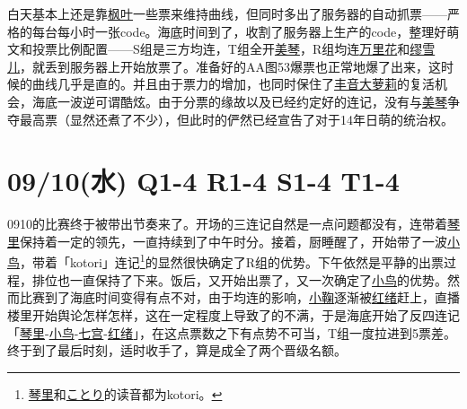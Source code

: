 
白天基本上还是靠\uline{枫叶}一些票来维持曲线，但同时多出了服务器的自动抓票——严格的每台每小时一张code。海底时间到了，收割了服务器上生产的code，整理好萌文和投票比例配置——S组是三方均连，T组全开\uline{美琴}，R组均连\uline{万里花}和\uline{缪雪儿}，就丢到服务器上开始放票了。准备好的AA图53爆票也正常地爆了出来，这时候的曲线几乎是直的。并且由于票力的增加，也同时保住了\uline{丰音大萝莉}的复活机会，海底一波逆可谓酷炫。由于分票的缘故以及已经约定好的连记，没有与\uline{美琴}争夺最高票（显然还煮了不少），但此时的俨然已经宣告了对于14年日萌的统治权。

\section{09/10(水) Q1-4 R1-4 S1-4 T1-4}


0910的比赛终于被带出节奏来了。开场的三连记自然是一点问题都没有，连带着\uline{琴里}保持着一定的领先，一直持续到了中午时分。接着，厨睡醒了，开始带了一波\uline{小鸟}，带着「kotori」连记\footnote{\uline{琴里}和\uline{ことり}的读音都为kotori。}的显然很快确定了R组的优势。下午依然是平静的出票过程，排位也一直保持了下来。饭后，又开始出票了，又一次确定了\uline{小鸟}的优势。然而比赛到了海底时间变得有点不对，由于均连的影响，\uline{小鞠}逐渐被\uline{红绪}赶上，直播楼里开始舆论怎样怎样，这在一定程度上导致了的不满，于是海底开始了反四连记「\uline{琴里}-\uline{小鸟}-\uline{七宫}-\uline{红绪}」，在这点票数之下有点势不可当，T组一度拉进到5票差。终于到了最后时刻，适时收手了，算是成全了两个晋级名额。

